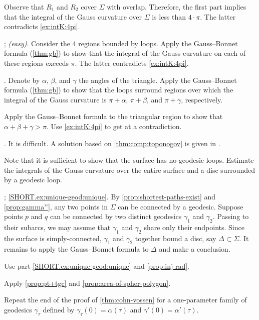 \begin{multicols}{2}
Observe that $R_1$ and $R_2$ cover $\Sigma$ with overlap.
Therefore, the first part implies that the integral of the Gauss curvature over $\Sigma$ is less than $4\cdot\pi$.
The latter contradicts \ref{ex:intK:4pi}.

\parbf{\ref{ex:self-intersections}}; \textit{(easy)}.
Consider the 4 regions bounded by loops.
Apply the Gauss--Bonnet formula (\ref{thm:gb}) to show that the integral of the Gauss curvature on each of these regions exceeds $\pi$.
The latter contradicts \ref{ex:intK:4pi}.

.
Denote by $\alpha$, $\beta$, and $\gamma$ the angles of the triangle.
Apply the Gauss--Bonnet formula (\ref{thm:gb}) to show that the loops surround regions over which the integral of the Gauss curvature is $\pi+\alpha$, $\pi+\beta$, and $\pi+\gamma$, respectively.

Apply the Gauss--Bonnet formula to the triangular region to show that $\alpha+\beta+\gamma>\pi$.
Use \ref{ex:intK:4pi} to get at a contradiction.


.
It is difficult.
A solution based on \ref{thm:comp:toponogov} is given in \cite{petrunin2021}.

 Note that it is sufficient to show that the surface has no geodesic loops.
Estimate the integrals of the Gauss curvature over the entire surface and a disc surrounded by a geodesic loop.

\parbf{\ref{ex:unique-geod}}; \ref{SHORT.ex:unique-geod:unique}.
By \ref{prop:shortest-paths-exist} and \ref{prop:gamma''}, any two points in $\Sigma$ can be connected by a geodesic.
Suppose points $p$ and $q$ can be connected by two distinct geodesics $\gamma_1$ and $\gamma_2$.
Passing to their subarcs, we may assume that $\gamma_1$ and $\gamma_2$ share only their endpoints.
Since the surface is simply-connected, $\gamma_1$ and $\gamma_2$ together bound a disc, say $\Delta\subset\Sigma$.
It remains to apply the Gauss--Bonnet formula to $\Delta$ and make a conclusion.
 
Use part \ref{SHORT.ex:unique-geod:unique} and \ref{prop:inj-rad}.

Apply \ref{prop:pt+tgc} and \ref{prop:area-of-spher-polygon}.

Repeat the end of the proof of \ref{thm:cohn-vossen} for a one-parameter family of geodesics $\gamma_\tau$ defined by $\gamma_\tau(0)=\alpha(\tau)$ and $\gamma'(0)=\alpha'(\tau)$. 


\end{multicols}
